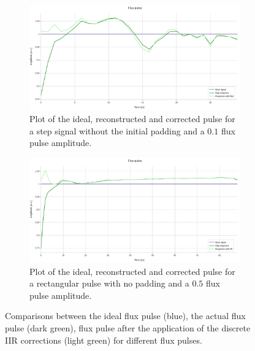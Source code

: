 \begin{figure}[h!]
    \centering
    \begin{subfigure}[t]{0.495\textwidth}
        \includegraphics[width=\textwidth]{figures/png/Cryoscope/filters/IIR_nopad.png}
        \caption{Plot of the ideal, reconstructed and corrected pulse for a step signal without the initial padding and a $0.1$ flux pulse amplitude.}
        \label{fig:IIR:nopad}
    \end{subfigure}
    \hfill
    \begin{subfigure}[t]{0.495\textwidth}
        \includegraphics[width=\textwidth]{figures/png/Cryoscope/filters_long/IIR.png}
        \caption{Plot of the ideal, reconstructed and corrected pulse for a rectangular pulse with no padding and a $0.5$ flux pulse amplitude.}
        \label{fig:IIR:long}
    \end{subfigure}
    \caption{Comparisons between the ideal flux pulse (blue), the actual flux pulse (dark green), flux pulse after the application of the discrete IIR corrections (light green) for different flux pulses.}
    \label{fig:IIR}
\end{figure}


